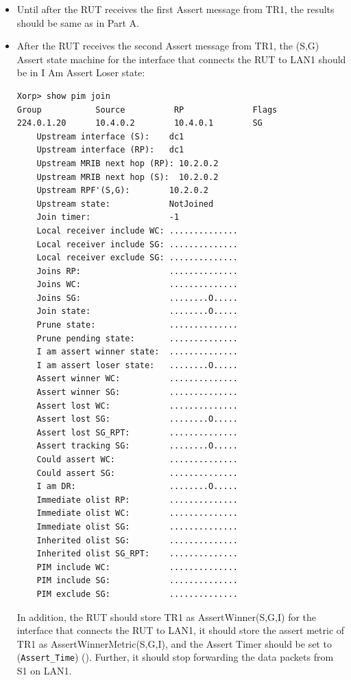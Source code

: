 \documentclass[11pt]{report}
\begin{document}
\begin{itemize}

  \item Until after the RUT receives the first Assert message from TR1, the
  results should be same as in Part A.

  \item After the RUT receives the second Assert message from TR1, the (S,G)
  Assert state machine for the interface that connects the RUT to LAN1 should
  be in I Am Assert Loser state:

\begin{verbatim}
Xorp> show pim join 
Group           Source          RP              Flags
224.0.1.20      10.4.0.2        10.4.0.1        SG   
    Upstream interface (S):    dc1
    Upstream interface (RP):   dc1
    Upstream MRIB next hop (RP): 10.2.0.2
    Upstream MRIB next hop (S):  10.2.0.2
    Upstream RPF'(S,G):        10.2.0.2
    Upstream state:            NotJoined 
    Join timer:                -1
    Local receiver include WC: ..............
    Local receiver include SG: ..............
    Local receiver exclude SG: ..............
    Joins RP:                  ..............
    Joins WC:                  ..............
    Joins SG:                  ........O.....
    Join state:                ........O.....
    Prune state:               ..............
    Prune pending state:       ..............
    I am assert winner state:  ..............
    I am assert loser state:   ........O.....
    Assert winner WC:          ..............
    Assert winner SG:          ..............
    Assert lost WC:            ..............
    Assert lost SG:            ........O.....
    Assert lost SG_RPT:        ..............
    Assert tracking SG:        ........O.....
    Could assert WC:           ..............
    Could assert SG:           ..............
    I am DR:                   ........O.....
    Immediate olist RP:        ..............
    Immediate olist WC:        ..............
    Immediate olist SG:        ..............
    Inherited olist SG:        ..............
    Inherited olist SG_RPT:    ..............
    PIM include WC:            ..............
    PIM include SG:            ..............
    PIM exclude SG:            ..............
\end{verbatim}

  In addition, the RUT should store TR1 as AssertWinner(S,G,I) for the
  interface that connects the RUT to LAN1, it should store the assert metric
  of TR1 as AssertWinnerMetric(S,G,I), and the Assert Timer should be set to
  (\verb=Assert_Time=) ({\PimsmAssertTime}).
  Further, it should stop forwarding the data packets from S1 on LAN1.

\end{itemize}
\end{document}
